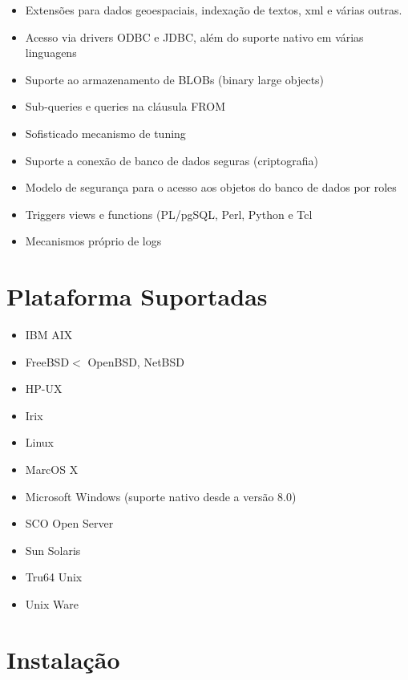 \begin{itemize}
\item{\bf }Extensões para dados geoespaciais, indexação de textos, xml e várias outras.

\item{\bf }Acesso via drivers ODBC e JDBC, além do suporte nativo em várias linguagens

\item{\bf }Suporte ao armazenamento de BLOBs (binary large objects)

\item{\bf }Sub-queries e queries na cláusula FROM

\item{\bf }Sofisticado mecanismo de tuning

\item{\bf }Suporte a conexão de banco de dados seguras (criptografia)

\item{\bf }Modelo de segurança para o acesso aos objetos do banco de dados por roles

\item{\bf }Triggers views e functions (PL/pgSQL, Perl, Python e Tcl

\item{\bf }Mecanismos próprio de logs
\end{itemize}

\section{Plataforma Suportadas}\setcounter{SteP}{1}

\begin{itemize}
\item{\bf }IBM AIX
\item{\bf }FreeBSD$<$ OpenBSD, NetBSD
\item{\bf }HP-UX
\item{\bf }Irix
\item{\bf }Linux
\item{\bf }MarcOS X
\item{\bf }Microsoft Windows (suporte nativo desde a versão 8.0)
\item{\bf }SCO Open Server
\item{\bf }Sun Solaris
\item{\bf }Tru64 Unix
\item{\bf }Unix Ware
\end{itemize}


\section{Instalação}\setcounter{SteP}{1}

